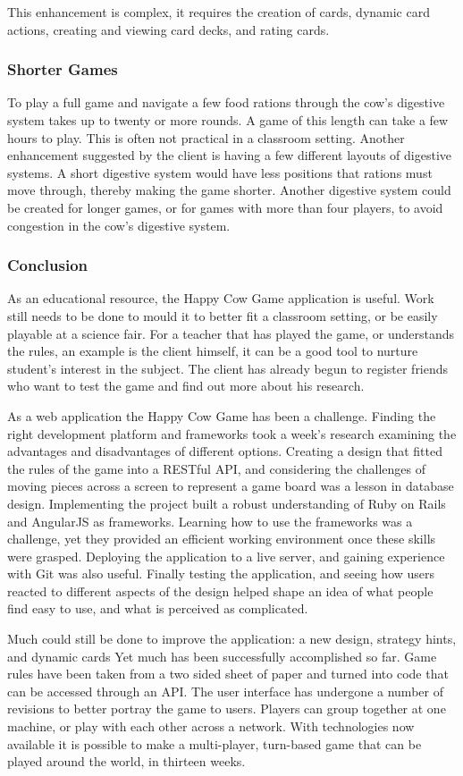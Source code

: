 This enhancement is complex, it requires the creation of cards, dynamic card actions, creating and viewing card decks, and rating cards.

\subsubsection{Shorter Games}
To play a full game and navigate a few food rations through the cow's digestive system takes up to twenty or more rounds. A game of this length can take a few hours to play. This is often not practical in a classroom setting. Another enhancement suggested by the client is having a few different layouts of digestive systems. A short digestive system would have less positions that rations must move through, thereby making the game shorter. Another digestive system could be created for longer games, or for games with more than four players, to avoid congestion in the cow's digestive system.

\subsubsection{Conclusion}
As an educational resource, the Happy Cow Game application is useful. Work still needs to be done to mould it to better fit a classroom setting, or be easily playable at a science fair. For a teacher that has played the game, or understands the rules, an example is the client himself, it can be a good tool to nurture student’s interest in the subject. The client has already begun to register friends who want to test the game and find out more about his research.

As a web application the Happy Cow Game has been a challenge. Finding the right development platform and frameworks took a week's research examining the advantages and disadvantages of different options. Creating a design that fitted the rules of the game into a RESTful API, and considering the challenges of moving pieces across a screen to represent a game board was a lesson in database design. Implementing the project built a robust understanding of Ruby on Rails and AngularJS as frameworks. Learning how to use the frameworks was a challenge, yet they provided an efficient working environment once these skills were grasped. Deploying the application to a live server, and gaining experience with Git was also useful. Finally testing the application, and seeing how users reacted to different aspects of the design helped shape an idea of what people find easy to use, and what is perceived as complicated.

Much could still be done to improve the application: a new design, strategy hints, and dynamic cards Yet much has been successfully accomplished so far. Game rules have been taken from a two sided sheet of paper and turned into code that can be accessed through an API. The user interface has undergone a number of revisions to better portray the game to users. Players can group together at one machine, or play with each other across a network. With technologies now available it is possible to make a multi-player, turn-based game that can be played around the world, in thirteen weeks.
